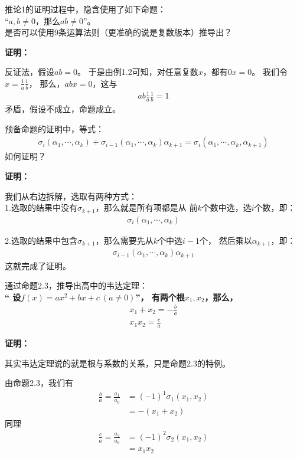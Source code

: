 \documentclass{article}
\begin{document}
\begin{zremark}
      推论1的证明过程中，隐含使用了如下命题：\\
      “$a, b \neq 0$，那么$ab \neq 0$”。\\
      是否可以使用9条运算法则（更准确的说是复数版本）推导出？
\end{zremark}

\textbf{证明：}

反证法，假设$ab = 0$。
于是由例1.2可知，对任意复数$x$，都有$0 x = 0$。
我们令$x = \frac{1}{a} \frac{1}{b}$，
那么，$ab x = 0$，这与
\begin{align*}
      ab \frac{1}{a} \frac{1}{b} = 1
\end{align*}
矛盾，假设不成立，命题成立。

\begin{zremark}
      预备命题的证明中，等式：
      \begin{align*}
            \sigma_i(\alpha_1,\cdots,\alpha_k)
            +
            \sigma_{i - 1}(\alpha_1, \cdots, \alpha_k)\alpha_{k + 1}
            =
            \sigma_i(\alpha_1, \cdots, \alpha_k, \alpha_{k + 1})
      \end{align*}
      如何证明？
\end{zremark}

\textbf{证明：}

我们从右边拆解，选取有两种方式：\\
1.选取的结果中没有$\sigma_{k + 1}$，那么就是所有项都是从
前$k$个数中选，选$i$个数，即：
\begin{align*}
      \sigma_{i}(\alpha_1,\cdots,\alpha_k)
\end{align*}

2.选取的结果中包含$\sigma_{k + 1}$，那么需要先从$k$个中选$i - 1$个，
然后乘以$\alpha_{k + 1}$，即：
\begin{align*}
      \sigma_{i - 1}(\alpha_1, \cdots, \alpha_k)\alpha_{k + 1}
\end{align*}
这就完成了证明。

\begin{zremark}
      通过命题2.3，推导出高中的韦达定理：\\
      \textbf{“
            设$f(x) = ax^2 + bx + c \ (a \neq 0)$”，
            有两个根$x_1, x_2$，那么，
            \begin{align*}
                  x_1 + x_2 = - \frac{b}{a} \\
                  x_1 x_2 = \frac{c}{a}
            \end{align*}
      }
\end{zremark}

\textbf{证明：}

其实韦达定理说的就是根与系数的关系，只是命题2.3的特例。

由命题2.3，我们有
\begin{align*}
      \frac{b}{a} = \frac{a_1}{a_0} & = (-1)^1 \sigma_1(x_1, x_2) \\
                                    & = - (x_1 + x_2)
\end{align*}
同理
\begin{align*}
      \frac{c}{a} = \frac{a_2}{a_0} & = (-1)^2 \sigma_2(x_1, x_2) \\
                                    & = x_1x_2
\end{align*}
\end{document}
